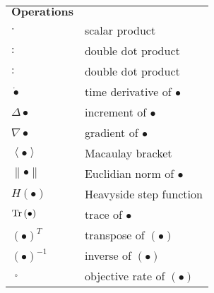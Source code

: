 \begin{table}[!hbp]
  \centering
    \begin{tabular}{p{4cm}p{9.5cm}}
    $\textbf{Operations}$ & \\
    $\cdot$  & scalar product \\
    $:$  & double dot product \\
    $:$  & double dot product \\
    ${\dot  \bullet }$  & time derivative of $\bullet$ \\
    ${\Delta  \bullet }$  & increment of $\bullet$ \\
    $\nabla \bullet$  & gradient of $\bullet$ \\
    $\left\langle  \bullet  \right\rangle$  & Macaulay bracket \\
    $\left\|  \bullet  \right\|$  & Euclidian norm of $\bullet$ \\
    $H\left(  \bullet  \right)$  & Heavyside step function \\
    $\rm{Tr}\left(  \bullet  \right)$  & trace of $\bullet$ \\
    ${\left(  \bullet  \right)^T}$  & transpose of $\left(  \bullet  \right)$ \\
    ${\left(  \bullet  \right)^{ - 1}}$  & inverse of $\left(  \bullet  \right)$ \\
    $\mathop {\left(  \bullet  \right)}\limits^ \circ$  & objective rate of $\left(  \bullet  \right)$ \\
    \end{tabular}%
  \label{Tab:operations}%
\end{table}%
\renewcommand\arraystretch{1.0}